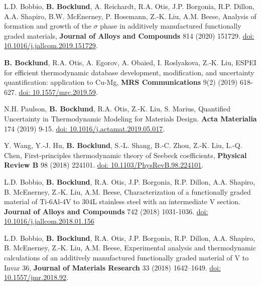 \item L.D. Bobbio, \textbf{B. Bocklund}, A. Reichardt, R.A. Otis, J.P. Borgonia, R.P. Dillon, A.A. Shapiro, B.W. McEnerney, P. Hosemann, Z.-K. Liu, A.M. Beese,
  Analysis of formation and growth of the $ \sigma $ phase in additively manufactured functionally graded materials,
  \textbf{Journal of Alloys and Compounds} 814 (2020) 151729.
  \href{https://doi.org/10.1016/j.jallcom.2019.151729}{doi: 10.1016/j.jallcom.2019.151729}.

\item \textbf{B. Bocklund}, R.A. Otis, A. Egorov, A. Obaied, I. Roslyakova, Z.-K. Liu,
  ESPEI for efficient thermodynamic database development, modification, and uncertainty quantification: application to Cu-Mg,
  \textbf{MRS Communications} 9(2) (2019) 618-627.
  \href{https://doi.org/10.1557/mrc.2019.59}{doi: 10.1557/mrc.2019.59}.

\item N.H. Paulson, \textbf{B. Bocklund}, R.A. Otis, Z.-K. Liu, S. Marius,
  Quantified Uncertainty in Thermodynamic Modeling for Materials Design.
  \textbf{Acta Materialia} 174 (2019) 9-15.
  \href{https://doi.org/10.1016/j.actamat.2019.05.017}{doi: 10.1016/j.actamat.2019.05.017}.

\item Y. Wang, Y.-J. Hu, \textbf{B. Bocklund}, S.-L. Shang, B.-C. Zhou, Z.-K. Liu, L.-Q. Chen,
  First-principles thermodynamic theory of Seebeck coefficients,
  \textbf{Physical Review B} 98 (2018) 224101.
  \href{https://doi.org/10.1103/PhysRevB.98.224101}{doi: 10.1103/PhysRevB.98.224101}.

\item L.D. Bobbio, \textbf{B. Bocklund}, R.A. Otis, J.P. Borgonia, R.P. Dillon, A.A. Shapiro, B. McEnerney, Z.-K. Liu, A.M. Beese,
  Characterization of a functionally graded material of Ti-6Al-4V to 304L stainless steel with an intermediate V section. \textbf{Journal of Alloys and Compounds} 742 (2018) 1031-1036.
  \href{https://doi.org/10.1016/j.jallcom.2018.01.156}{doi: 10.1016/j.jallcom.2018.01.156}

\item L.D. Bobbio, \textbf{B. Bocklund}, R.A. Otis, J.P. Borgonia, R.P. Dillon, A.A. Shapiro, B. McEnerney, Z.-K. Liu, A.M. Beese,
  Experimental analysis and thermodynamic calculations of an additively manufactured functionally graded material of V to Invar 36,
  \textbf{Journal of Materials Research} 33 (2018) 1642–1649.
  \href{https://doi.org/10.1016/10.1557/jmr.2018.92}{doi: 10.1557/jmr.2018.92}.

